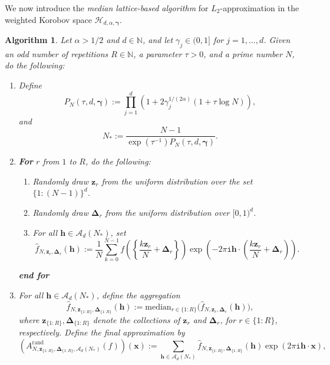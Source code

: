 \documentclass[pdflatex,sn-basic,Numbered]{sn-jnl}%
\newcommand{\rand}{\mathrm{rand}}
\newcommand{\bsh}{\boldsymbol{h}}
\newcommand{\bsx}{\boldsymbol{x}}
\newcommand{\bsz}{\boldsymbol{z}}
\newcommand{\bsgamma}{\boldsymbol{\gamma}}
\newcommand{\bsDelta}{\boldsymbol{\Delta}}
\newcommand{\NN}{\mathbb{N}}
\newcommand{\Acal}{\mathcal{A}}
\newcommand{\Hcal}{\mathcal{H}}
\newcommand{\icomp}{\mathtt{i}}
\theoremstyle{thmstyleone}%
\newtheorem{algorithm}[theorem]{Algorithm}
\theoremstyle{thmstyletwo}%
\begin{document}
We now introduce the \emph{median lattice-based algorithm} for $L_2$-approximation in the weighted Korobov space $\Hcal_{d,\alpha,\bsgamma}$. 
\begin{algorithm}\label{alg:median}
    Let $\alpha>1/2$ and $d \in \NN$, and let $\gamma_j \in (0,1]$ for $j = 1, \ldots, d$. Given an odd number of repetitions $R \in \NN$, a parameter $\tau > 0$, and a prime number $N$, do the following:
    \begin{enumerate}
        \item Define 
        \begin{equation}\label{eqn:PN}
        P_N(\tau,d,\bsgamma):=\prod_{j=1}^d \left(1+ 2\gamma_j^{1/(2\alpha)} (1+\tau\log N)\right),
        \end{equation}
        and
        \begin{equation}\label{eqn:Nstar}
        N_*:=\frac{N-1 }{\exp(\tau^{-1})P_{N}(\tau,d,\bsgamma)}.
        \end{equation}
        \item \textbf{For} $r$ from $1$ to $R$, do the following:
        \begin{enumerate}
            \item Randomly draw $\bsz_{r}$ from the uniform distribution over the set $\{1{:}(N-1)\}^d$.
            \item Randomly draw $\bsDelta_r$ from the uniform distribution over 
            $[0,1)^d$.
            \item For all $\bsh\in \Acal_d(N_*)$, set
            \[ 
            \widehat{f}_{N,\bsz_r,\bsDelta_r}(\bsh):=
            \frac{1}{N} \sum_{k=0}^{N-1} f\left( \left\{ \frac{k \bsz_r}{N}+\bsDelta_r \right\}\right)\exp\left(-2\pi \icomp \bsh \cdot \left( \frac{k \bsz_r}{N}+\bsDelta_r\right)\right).
            \]   
        \end{enumerate}
       \textbf{end for}
       \item For all $\bsh\in \Acal_d(N_*)$, define the aggregation
       \[ 
            \widehat{f}_{N,\bsz_{\{1{:}R\}},\bsDelta_{\{1{:}R\}}}(\bsh):=\mathrm{median}_{r\in\{1{:}R\}} \Big(\widehat{f}_{N,\bsz_r,\bsDelta_r}(\bsh)\Big),
       \]
       where $\bsz_{\{1{:}R\}},\bsDelta_{\{1{:}R\}}$ denote the collections of $\bsz_r$ and $\bsDelta_r$, for $r\in\{1{:}R\}$, respectively.
       Define the final approximation by
        \[ 
        (A^{\rand}_{N,\bsz_{\{1{:}R\}},\bsDelta_{\{1{:}R\}},\Acal_d(N_*)}(f))(\bsx):= \sum_{\bsh \in \Acal_d(N_*)} \widehat{f}_{N,\bsz_{\{1{:}R\}},\bsDelta_{\{1{:}R\}}}(\bsh) \exp (2 \pi \icomp \bsh \cdot \bsx),\]
\end{enumerate}
\end{algorithm}
\end{document}
